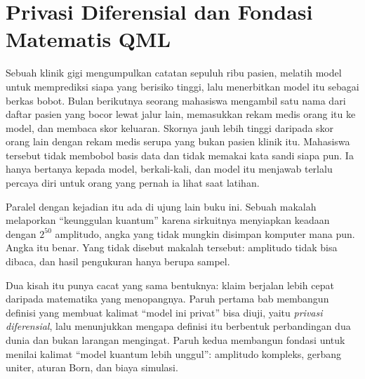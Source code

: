 \chapter{Privasi Diferensial dan Fondasi Matematis QML}

Sebuah klinik gigi mengumpulkan catatan sepuluh ribu pasien, melatih model untuk
memprediksi siapa yang berisiko tinggi, lalu menerbitkan model itu sebagai berkas
bobot. Bulan berikutnya seorang mahasiswa mengambil satu nama dari daftar pasien yang
bocor lewat jalur lain, memasukkan rekam medis orang itu ke model, dan membaca skor
keluaran. Skornya jauh lebih tinggi daripada skor orang lain dengan rekam medis
serupa yang bukan pasien klinik itu. Mahasiswa tersebut tidak membobol basis data dan
tidak memakai kata sandi siapa pun. Ia hanya bertanya kepada model, berkali-kali, dan
model itu menjawab terlalu percaya diri untuk orang yang pernah ia lihat saat latihan.

Paralel dengan kejadian itu ada di ujung lain buku ini. Sebuah makalah melaporkan
``keunggulan kuantum'' karena sirkuitnya menyiapkan keadaan dengan $2^{50}$ amplitudo,
angka yang tidak mungkin disimpan komputer mana pun. Angka itu benar. Yang tidak
disebut makalah tersebut: amplitudo tidak bisa dibaca, dan hasil pengukuran hanya
berupa sampel.

Dua kisah itu punya cacat yang sama bentuknya: klaim berjalan lebih cepat daripada
matematika yang menopangnya. Paruh pertama bab membangun definisi yang membuat kalimat
``model ini privat'' bisa diuji, yaitu \emph{privasi diferensial}, lalu menunjukkan
mengapa definisi itu berbentuk perbandingan dua dunia dan bukan larangan mengingat.
Paruh kedua membangun fondasi untuk menilai kalimat ``model kuantum lebih unggul'':
amplitudo kompleks, gerbang uniter, aturan Born, dan biaya simulasi.



